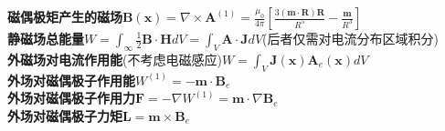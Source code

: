 \documentclass[10pt,a4paper]{article}
\begin{document}
\begin{multicols}{2}
\indent\indent\textbf{磁偶极矩产生的磁场}$\bm{B}(\bm{x})=\nabla\times\bm{A}^{(1)}=\frac{\mu_0}{4\pi}[\frac{3(\bm{m}\cdot\bm{R})\bm{R}}{R^5}-\frac{\bm{m}}{R^3}]$\\
\textbf{静磁场总能量}$W=\int_{\infty}\frac{1}{2}\bm{B}\cdot\bm{H}dV=\int_V\bm{A}\cdot\bm{J}dV$(后者仅需对电流分布区域积分)\\
\indent\textbf{外磁场对电流作用能}(不考虑电磁感应)$W=\int_V\bm{J}(\bm{x})\bm{A}_e(\bm{x})dV$\\
\indent\textbf{外场对磁偶极子作用能}$W^{(1)}=-\bm{m}\cdot\bm{B}_e$\\
\indent\textbf{外场对磁偶极子作用力}$\bm{F}=-\nabla W^{(1)}=\bm{m}\cdot\nabla\bm{B}_e$\\
\indent\textbf{外场对磁偶极子力矩}$\bm{L}=\bm{m}\times\bm{B}_e$
\end{multicols}
\end{document}
